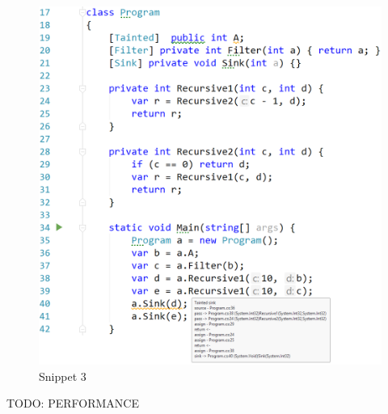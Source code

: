\begin{figure}[h]
	\includegraphics[width=\linewidth]{screenshots/Recursion.png}
	\caption{Snippet 3}
	\label{fig:Recursion}
\end{figure}

TODO: PERFORMANCE
